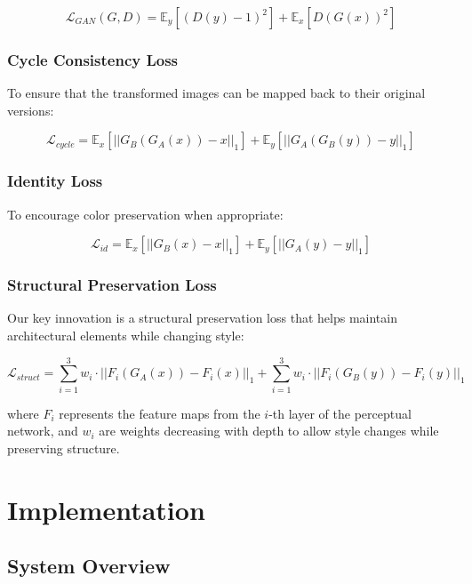 \documentclass[twocolumn,superscriptaddress,aps]{revtex4-1}
\begin{document}
\begin{equation}
\mathcal{L}_{GAN}(G, D) = \mathbb{E}_{y}[(D(y) - 1)^2] + \mathbb{E}_{x}[D(G(x))^2]
\end{equation}

\subsubsection{Cycle Consistency Loss}

To ensure that the transformed images can be mapped back to their original versions:

\begin{equation}
\mathcal{L}_{cycle} = \mathbb{E}_{x}[||G_B(G_A(x)) - x||_1] + \mathbb{E}_{y}[||G_A(G_B(y)) - y||_1]
\end{equation}

\subsubsection{Identity Loss}

To encourage color preservation when appropriate:

\begin{equation}
\mathcal{L}_{id} = \mathbb{E}_{x}[||G_B(x) - x||_1] + \mathbb{E}_{y}[||G_A(y) - y||_1]
\end{equation}

\subsubsection{Structural Preservation Loss}

Our key innovation is a structural preservation loss that helps maintain architectural elements while changing style:

\begin{equation}
\mathcal{L}_{struct} = \sum_{i=1}^{3} w_i \cdot ||F_i(G_A(x)) - F_i(x)||_1 + \sum_{i=1}^{3} w_i \cdot ||F_i(G_B(y)) - F_i(y)||_1
\end{equation}

where $F_i$ represents the feature maps from the $i$-th layer of the perceptual network, and $w_i$ are weights decreasing with depth to allow style changes while preserving structure.

\section{Implementation}

\subsection{System Overview}
\end{document}
